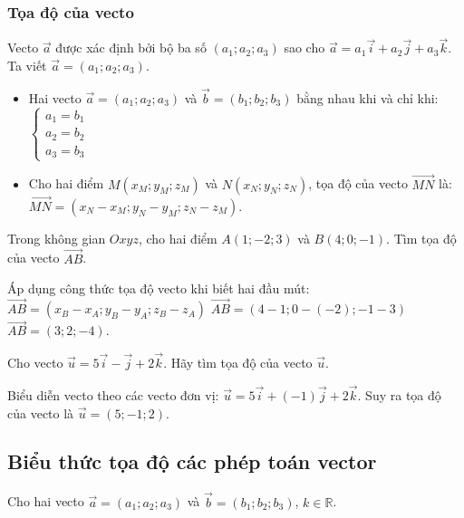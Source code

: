 \documentclass[12pt]{article}
\begin{document}
	\subsubsection{Tọa độ của vecto}
	Vecto $\vec{a}$ được xác định bởi bộ ba số $(a_1; a_2; a_3)$ sao cho $\vec{a} = a_1\vec{i} + a_2\vec{j} + a_3\vec{k}$. Ta viết $\vec{a} = (a_1; a_2; a_3)$.
	\begin{itemize}
		\item Hai vecto $\vec{a} = (a_1; a_2; a_3)$ và $\vec{b} = (b_1; b_2; b_3)$ bằng nhau khi và chỉ khi:
		$\begin{cases} a_1 = b_1 \\ a_2 = b_2 \\ a_3 = b_3 \end{cases}$
		\item Cho hai điểm $M(x_M; y_M; z_M)$ và $N(x_N; y_N; z_N)$, tọa độ của vecto $\vec{MN}$ là:
		$\vec{MN} = (x_N - x_M; y_N - y_M; z_N - z_M)$.
	\end{itemize}
	
	\begin{vidu}[2]
		Trong không gian $Oxyz$, cho hai điểm $A(1; -2; 3)$ và $B(4; 0; -1)$. Tìm tọa độ của vecto $\vec{AB}$.
	\end{vidu}
	
	\begin{loigiai}
		Áp dụng công thức tọa độ vecto khi biết hai đầu mút:
		$\vec{AB} = (x_B - x_A; y_B - y_A; z_B - z_A)$
		$\vec{AB} = (4 - 1; 0 - (-2); -1 - 3)$
		$\vec{AB} = (3; 2; -4)$.
	\end{loigiai}
	
	\begin{vidu}[3]
		Cho vecto $\vec{u} = 5\vec{i} - \vec{j} + 2\vec{k}$. Hãy tìm tọa độ của vecto $\vec{u}$.
	\end{vidu}
	
	\begin{loigiai}
		Biểu diễn vecto theo các vecto đơn vị: $\vec{u} = 5\vec{i} + (-1)\vec{j} + 2\vec{k}$.
		Suy ra tọa độ của vecto là $\vec{u} = (5; -1; 2)$.
	\end{loigiai}
	
	\subsection{Biểu thức tọa độ các phép toán vector}

	
	Cho hai vecto $\vec{a} = (a_1; a_2; a_3)$ và $\vec{b} = (b_1; b_2; b_3)$, $k \in \mathbb{R}$.
	
\end{document}
